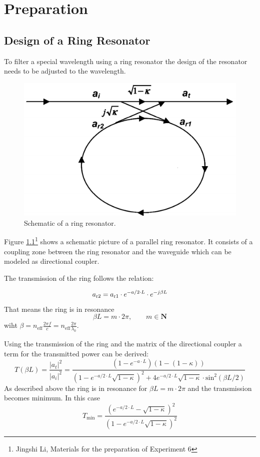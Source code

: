 \chapter{Preparation}


\section{Design of a Ring Resonator}
\label{design}
To filter a special wavelength using a ring resonator the design of the resonator needs to be adjusted to the wavelength.
\begin{figure}[h]%
\centering
\includegraphics[width=.5\columnwidth]{Grafiken/Resonator.png}%
\caption{Schematic of a ring resonator.}%
\label{fig:p1_ring}%
\end{figure} 
Figure \ref{fig:p1_ring}\footnote[1]{Jingshi Li, Materials for the preparation of Experiment 6} shows a schematic picture of a parallel ring resonator. It consists of a coupling zone between the ring resonator and the waveguide which can be modeled as directional coupler\footnotemark[1].

The transmission of the ring follows the relation:

\begin{equation}
a_{\mathrm{r2}}=a_{\mathrm{r1}}\cdot e^{-a/2\cdot L}\cdot e^{-j\beta L}
\label{eq:}
\end{equation}
That means the ring is in resonance
\begin{equation}
\beta L = m\cdot2\pi,\qquad m \in \mathbf{N}
\label{eq:}
\end{equation}
wiht $\beta = n_{\mathrm{eff}} \frac{2\pi f}{c} = n_{\mathrm{eff}} \frac{2\pi}{\lambda_0}$.

Using the transmission of the ring and the matrix of the directional coupler a term for the transmitted power can be derived\footnotemark[1]:
\begin{equation}
T(\beta L) = \frac{|a_t|^2}{|a_i|^2}= \frac{(1-e^{-a\cdot L})(1-(1-\kappa))}{(1-e^{-a/2\cdot L}\sqrt{1-\kappa})^2+4e^{-a/2\cdot L}\sqrt{1-\kappa}\cdot\mathrm{sin}^2(\beta L / 2)}
\label{eq:}
\end{equation}
As described above the ring is in resonance for $\beta L = m\cdot2\pi$ and the transmission becomes minimum. 
In this case
\begin{equation}
T_{\mathrm{min}}=\frac{(e^{-a/2\cdot L} - \sqrt{1-\kappa})^2}{(1 - e^{-a/2\cdot L}\sqrt{1-\kappa})^2}
\label{eq:}
\end{equation}

